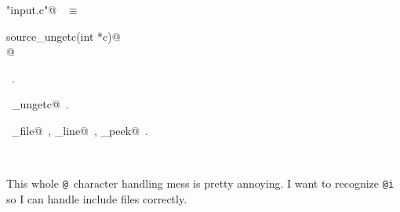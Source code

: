 \documentclass{report}
\begin{document}
\begin{flushleft} \small
\begin{minipage}{\linewidth} \label{scrap140}
\verb@"input.c"@\nobreak\ {\footnotesize {} }$\equiv$
\vspace{-1ex}
\begin{list}{}{} \item
\mbox{}\verb@int source_ungetc(int *c)@\\
\mbox{}@\\
\mbox{}\verb@@{\NWsep}
\end{list}
\vspace{-1ex}
\footnotesize\addtolength{\baselineskip}{-1ex}
\begin{list}{}{\setlength{\itemsep}{-\parsep}\setlength{\itemindent}{-\leftmargin}}
\item \NWtxtFileDefBy\ .
\end{list}
\vspace{-2ex}
\footnotesize\addtolength{\baselineskip}{-1ex}
\begin{list}{}{\setlength{\itemsep}{-\parsep}\setlength{\itemindent}{-\leftmargin}}
\item \NWtxtIdentsDefed\nobreak\  \verb@source_ungetc@\nobreak\ .\end{list}
\vspace{-2ex}
\footnotesize\addtolength{\baselineskip}{-1ex}
\begin{list}{}{\setlength{\itemsep}{-\parsep}\setlength{\itemindent}{-\leftmargin}}
\item \NWtxtIdentsUsed\nobreak\  \verb@source_file@\nobreak\ , \verb@source_line@\nobreak\ , \verb@source_peek@\nobreak\ .\end{list}
\end{minipage}\\[4ex]
\end{flushleft}
This whole \verb|@|~character handling mess is pretty annoying.
I want to recognize \verb|@i| so I can handle include files correctly.
\end{document}

